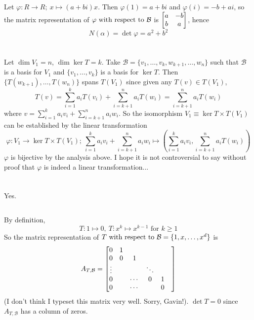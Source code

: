 \documentclass[12pt]{article}
\begin{document}
\subsection{} 
Let $\varphi: R \rightarrow R; \: x \mapsto (a + bi)x$. 
Then $\varphi(1) = a + bi$ and $\varphi(i) = -b + ai$, so the matrix representation of $\varphi \text{ with respect to } \mathcal{B}$ is $\begin{bmatrix}a & -b \\ b & a\end{bmatrix}$, hence
$$N(\alpha) = \det \varphi = a^2 + b^2$$

\section{}
Let $\dim V_1 = n$, $\dim \ker T = k$.
Take $\mathcal{B} = \{v_1, \ldots, v_k, w_{k + 1}, \ldots, w_n\}$ such that $\mathcal{B}$ is a basis for $V_1$ and $\{v_1, \ldots, v_k\}$ is a basis for $\ker T$. 
Then $\{T(w_{k + 1}), \ldots, T(w_{n})\}$ spans $T(V_1)$ since given any $T(v) \in T(V_1)$, 
$$T(v) = \sum_{i = 1}^{k} a_i T(v_i) + \sum_{i = k + 1}^{n} a_i T(w_i) = \sum_{i = k + 1}^{n} a_i T(w_i)$$
where $v = \sum_{i = 1}^{k} a_i v_i + \sum_{i = k + 1}^{n} a_i w_i$. 
So the isomorphism $V_1 \equiv \ker T \times T(V_1)$ can be established by the linear transformation  
$$\varphi: V_1 \rightarrow \ker T \times T(V_1); \: \sum_{i = 1}^{k} a_i v_i + \sum_{i = k + 1}^{n} a_i w_i \mapsto \left(\sum_{i = 1}^{k} a_i v_i, \sum_{i = k + 1}^{n} a_i T(w_i) \right)$$
$\varphi$ is bijective by the analysis above. 
I hope it is not controversial to say without proof that $\varphi$ is indeed a linear transformation...

\section{}
\subsection{}
Yes. 

\subsection{}
By definition, 
$$T: 1 \mapsto 0, \: T: x^k \mapsto x^{k - 1} \text{ for } k \geq 1$$
So the matrix representation of $T \text{ with respect to } \mathcal{B} = \{1, x, \ldots, x^d\}$ is 
$$A_{T, \mathcal{B}} = \begin{bmatrix}0 & 1 \\ 0 & 0 & 1 \\ \vdots & & & \ddots \\ 0 & & \cdots & 0 & 1 & \\ 0 & & \cdots & & 0\end{bmatrix}$$ 
(I don't think I typeset this matrix very well. Sorry, Gavin!). 
$\det T = 0$ since $A_{T, \mathcal{B}}$ has a column of zeros. 
\end{document}
